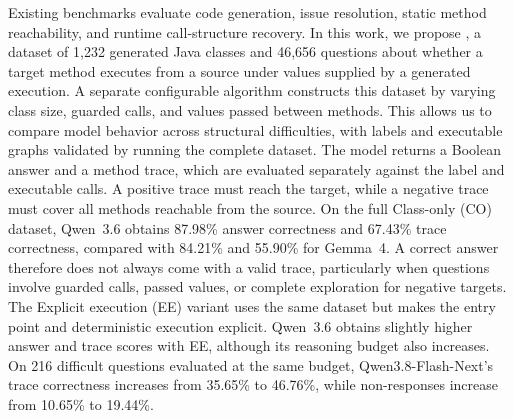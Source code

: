 Existing benchmarks evaluate code generation, issue resolution, static method reachability, and runtime call-structure recovery. In this work, we propose \benchmark, a dataset of 1,232 generated Java classes and 46,656 questions about whether a target method executes from a source under values supplied by a generated execution. A separate configurable algorithm constructs this dataset by varying class size, guarded calls, and values passed between methods. This allows us to compare model behavior across structural difficulties, with labels and executable graphs validated by running the complete dataset. The model returns a Boolean answer and a method trace, which are evaluated separately against the label and executable calls. A positive trace must reach the target, while a negative trace must cover all methods reachable from the source. On the full Class-only (CO) dataset, Qwen~3.6 obtains 87.98\% answer correctness and 67.43\% trace correctness, compared with 84.21\% and 55.90\% for Gemma~4. A correct answer therefore does not always come with a valid trace, particularly when questions involve guarded calls, passed values, or complete exploration for negative targets. The Explicit execution (EE) variant uses the same dataset but makes the entry point and deterministic execution explicit. Qwen~3.6 obtains slightly higher answer and trace scores with EE, although its reasoning budget also increases. On 216 difficult questions evaluated at the same budget, Qwen3.8-Flash-Next's trace correctness increases from 35.65\% to 46.76\%, while non-responses increase from 10.65\% to 19.44\%.
